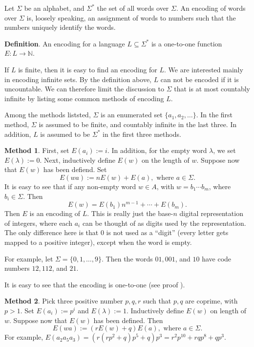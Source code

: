\documentclass[12pt]{article}
\begin{document}
Let $\Sigma$ be an alphabet, and $\Sigma^*$ the set of all words over $\Sigma$.  An encoding of words over $\Sigma$ is, loosely speaking, an assignment of words to numbers such that the numbers uniquely identify the words.

\textbf{Definition}.  An encoding for a language $L\subseteq \Sigma^*$ is a one-to-one function $E:L \to \mathbb{N}$.

If $L$ is finite, then it is easy to find an encoding for $L$.  We are interested mainly in encoding infinite sets.  By the definition above, $L$ can not be encoded if it is uncountable.  We can therefore limit the discussion to $\Sigma$ that is at most countably infinite by listing some common methods of encoding $L$.

Among the methods liststed, $\Sigma$ is an enumerated set $\lbrace a_1, a_2, \ldots \rbrace$.  In the first method, $\Sigma$ is assumed to be finite, and countably infinite in the last three.  In addition, $L$ is assumed to be $\Sigma^*$ in the first three methods.

\textbf{Method 1}.  First, set $E(a_i):=i$.  In addition, for the empty word $\lambda$, we set $E(\lambda):=0$.  Next, inductively define $E(w)$ on the length of $w$.  Suppose now that $E(w)$ has been defiend.  Set $$E(wa):=n E(w)+E(a),\mbox{ where }a \in \Sigma.$$
It is easy to see that if any non-empty word $w\in A$, with $w=b_1\cdots b_m$, where $b_i \in \Sigma$.  Then $$E(w)= E(b_1) n^{m-1} + \cdots + E(b_m).$$
Then $E$ is an encoding of $L$.  This is really just the base-$n$ digital representation of integers, where each $a_i$ can be thought of as digits used by the representation.  The only difference here is that $0$ is not used as a ``digit'' (every letter gets mapped to a positive integer), except when the word is empty.  

For example, let $\Sigma=\lbrace 0,1,\ldots,9\rbrace$.  Then the words $01, 001$, and $10$ have code numbers $12, 112$, and $21$.

It is easy to see that the encoding is one-to-one (see proof ).

\textbf{Method 2}.  Pick three positive number $p,q,r$ such that $p,q$ are coprime, with $p>1$.  Set $E(a_i):=p^i$ and $E(\lambda):=1$.  Inductively define $E(w)$ on length of $w$.  Suppose now that $E(w)$ has been defined.  Then $$E(wa):=(rE(w)+q)E(a), \mbox{ where }a\in \Sigma.$$  
For example, $E(a_2 a_5 a_3) = (r(rp^2+q)p^5+q)p^3 = r^2p^{10} + rq p^8 + q p^3$.
\end{document}
